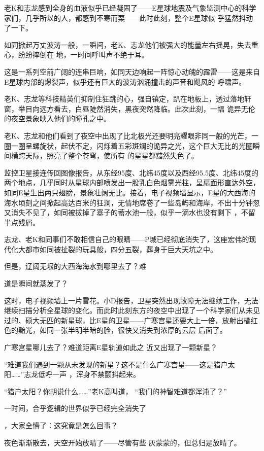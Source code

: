 \documentclass{article}
\begin{document}
老K和志龙感到全身的血液似乎已经凝固了——E星球地震及气象监测中心的科学家们，几乎所以的人，都感到不寒而栗——此时此刻，整个E星球似
乎猛然抖动了一下。 

如同掀起万丈波涛一般，一瞬间，老K、志龙他们被强大的能量左右摇晃，失去重心，纷纷摔倒在
地，一时间呼叫声不绝于耳。 

这是一系列空前广阔的连串巨响，如同天边响起一阵惊心动魄的霹雷——这是来自E星球内部的爆裂声，似乎还有巨大的波涛汹涌撞击的声音和飓风的
呼啸声。 

老K、志龙等科技精英们抑制住狂跳的心，强自镇定，趴在地板上，透过落地轩窗，举目向远方看去，白昼陡然消失，黑夜突然降临。此次此刻，一幅
诡异无伦的夜空景象映入他们的瞳孔之中。 

\newpage

老K、志龙和他们看到了夜空中出现了比北极光还要明亮耀眼非同一般的光芒，一圈一圈呈螺旋状，起伏不定，闪烁着五彩斑斓的诡异之光，这个巨大无比的光圈瞬间横跨天际，照亮了整个苍穹，使所有
的星星都黯然失色了。 

监控卫星接连传回图像报告，从东经95度、北纬45度以及西经95.5度、北纬45度的两个地点，几乎同时从星球内部喷发出一股乳白色烟雾光柱，呈扇面形直达外空，如同E星生出两只翅膀，景象壮阔无比。接着，电子视频墙显示，E星的大西海的海水顷刻之间掀起高达百米的狂澜，无情地席卷了一些岛屿和海岸，不出十分钟忽又消失不见了，如同被拔掉了塞子的蓄水池一般，似乎一滴水也没有剩下
，不留半点残屑。 

志龙、老K和同事们不敢相信自己的眼睛——P城已经彻底消失了，这座宏伟的现代化大都市如同被扯裂的玩具般，四分五裂，葬身于巨大天坑之中。

但是，辽阔无垠的大西海海水到哪里去了？难
\newpage

道是瞬间就蒸发了？ 

这时，电子视频墙上一片雪花。小D报告，卫星突然出现故障无法继续工作，无法继续扫描分析全星球的变化。而此时此刻东方的夜空中出现了一个科学家们从未见过的、硕大无匹的新星球，比E星的卫星——广寒宫星还要大上一倍，放射出橘红色的黯光，如同一张半明半暗的脸，很快又消失到浓厚的云层
后面了。 

广寒宫星哪儿去了？难道距离E星轨道如此之
近又出现了一颗新星？ 

“难道我们遇到一颗从未发现的新星？这不是什么广寒宫星——这是猎户太阳……”志龙低呼一声
，浑身不禁颤抖起来。 

“猎户太阳？你胡说什么……”老K高叫道，
“我们的神智难道都浑沌了？” 

一时间，合乎逻辑的世界似乎已经完全消失了
\newpage

，大家全懵了：这究竟是怎么回事？ 

夜色渐渐散去，天空开始放晴了——尽管有些
灰蒙蒙的，但总归是放晴了。 
\end{document}
